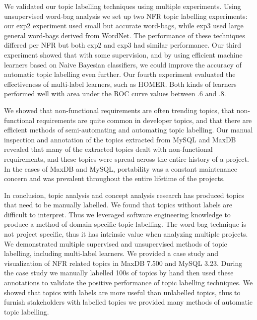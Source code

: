 \documentclass[]{sig-alternate}
\begin{document}
We validated our topic labelling techniques using multiple experiments.
Using unsupervised word-bag analysis we set up two NFR topic labelling experiments: 
our \textsf{exp2} experiment used small but accurate word-bags, while \textsf{exp3} used large general word-bags derived from WordNet.
The performance of these techniques differed per NFR but both \textsf{exp2} and \textsf{exp3} had similar performance.
Our third experiment showed that with some supervision, and by using efficient machine learners based on Naive Bayesian classifiers, we could improve the accuracy of automatic topic labelling even further.
Our fourth experiment evaluated the effectiveness of multi-label learners, such as HOMER. 
Both kinds of learners performed well with area under the ROC curve values between $.6$ and $.8$.

We showed that non-functional requirements are often trending topics, that non-functional requirements are quite common in developer topics, and that there are efficient methods of semi-automating and automating topic labelling.
Our manual inspection and annotation of the topics extracted from MySQL and MaxDB revealed that many of the extracted topics dealt with non-functional requirements, and these topics were spread across the entire history of a project. 
In the cases of MaxDB and MySQL, portability was a constant maintenance concern and was prevalent throughout the entire lifetime of the projects.

In conclusion,
topic analysis and concept analysis research has produced topics that need to be manually labelled. 
We found that topics without labels are difficult to interpret.
Thus we leveraged software engineering knowledge to produce a method of domain specific topic labelling.
The word-bag technique is not project specific, thus it has intrinsic value when analyzing multiple projects.
We demonstrated multiple supervised and unsupervised methods of topic labelling, including multi-label learners.
We provided a case study and visualization of NFR related topics in MaxDB 7.500 and MySQL 3.23. 
During the case study we manually labelled 100s of topics by hand then used these annotations to validate the positive performance of topic labelling techniques.
We showed that topics with labels are more useful than unlabelled topics, thus to furnish stakeholders with labelled topics we provided many methods of automatic topic labelling.
\end{document}

